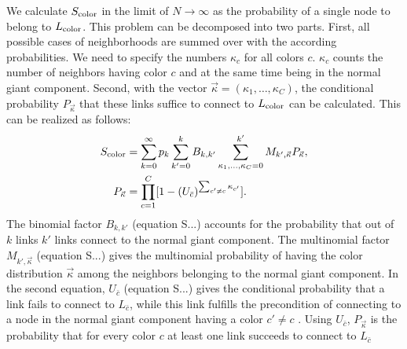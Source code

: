 \documentclass[aps, pre, twocolumn, a4paper, floatfix]{revtex4}
\begin{document}
We calculate $S_{\rm color}$ in the limit of $N\to \infty$ as the probability of a 
single node to belong to $L_{\rm color}$. This problem can be decomposed into two parts. 
First, all possible cases of neighborhoods are summed over with the according 
probabilities. We need to specify the numbers $\kappa_c$ for all colors $c$. $\kappa_c$ 
counts the number of neighbors having color $c$ and at the same time being in the normal
giant component. Second, with the vector ${\vec \kappa}=(\kappa_1,\dots,\kappa_C)$, the conditional 
probability $P_{\vec \kappa}$ that these links suffice to connect to $L_{\rm color}$ can 
be calculated. This can be realized as follows:
\begin{align}
S_{\rm color} &= \sum_{k=0}^{\infty}p_k \sum_{k'=0}^{k} B_{k,k'} 
\sum_{\kappa_1,\dots, \kappa_C=0}^{k'} M_{k',\vec \kappa} 
P_{\vec \kappa},\label{eq:s_color}\\
P_{\vec \kappa} &= \prod_{c=1}^C [1-(U_{\bar c})^{\sum_{c'\neq c} \kappa_{c'} }].
\end{align}
The binomial factor $B_{k,k'}$ (equation S...) accounts for the probability that out of 
$k$ links $k'$ links connect to the normal giant component. The multinomial factor 
$M_{k',\vec \kappa}$ (equation S...) gives the multinomial probability of having the color 
distribution ${\vec \kappa}$ among the neighbors belonging to the normal giant component. 
In the second equation, $U_{\bar c}$ (equation S...) gives the conditional probability that a link 
fails to connect to $L_{\bar c}$, while this 
link fulfills the precondition of connecting to a node in the normal giant component 
having a color $c'\neq c$ . Using $U_{\bar c}$, $P_{\vec \kappa}$ is the probability that for every 
color $c$ at least one link succeeds to connect to $L_{\bar c}$
\end{document}
